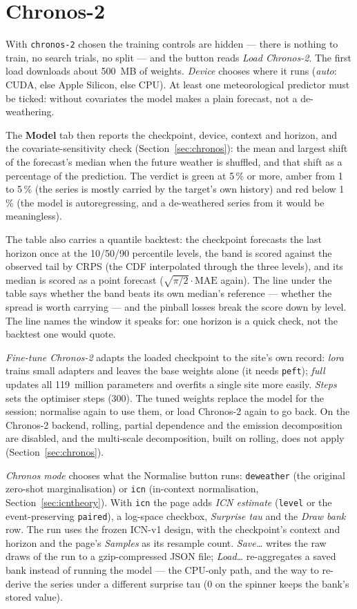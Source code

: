 \documentclass[11pt]{report}
\newcommand{\codeunderscore}{\textunderscore\allowbreak}
\newcommand{\code}[1]{\texttt{\let\_\codeunderscore #1}}
\newcommand{\tab}[1]{\textbf{#1}}
\begin{document}
\section{Chronos-2}\label{sec:chronosui}
With \code{chronos-2} chosen the training controls are hidden --- there is nothing to
train, no search trials, no split --- and the button reads \emph{Load Chronos-2}. The first load
downloads about 500~MB of weights. \emph{Device} chooses where it runs (\emph{auto}:
CUDA, else Apple Silicon, else CPU). At least one meteorological predictor must be
ticked: without covariates the model makes a plain forecast, not a de-weathering.

The \tab{Model} tab then reports the checkpoint, device, context and horizon, and the
covariate-sensitivity check (Section~\ref{sec:chronos}): the mean and largest shift of the
forecast's median when the future weather is shuffled, and that shift as a percentage of
the prediction. The verdict is green at 5\,\% or more, amber from 1 to 5\,\% (the series is
mostly carried by the target's own history) and red below 1\,\% (the model is
autoregressing, and a de-weathered series from it would be meaningless).

The table also carries a quantile backtest: the checkpoint forecasts the last horizon once
at the 10/50/90 percentile levels, the band is scored against the observed tail by CRPS
(the CDF interpolated through the three levels), and its median is scored as a point
forecast ($\sqrt{\pi/2}\cdot\mathrm{MAE}$ again). The line under the table says whether the
band beats its own median's reference --- whether the spread is worth carrying --- and the
pinball losses break the score down by level. The line names the window it speaks for: one
horizon is a quick check, not the backtest one would quote.

\emph{Fine-tune Chronos-2} adapts the loaded checkpoint to the site's own record:
\emph{lora} trains small adapters and leaves the base weights alone (it needs
\code{peft}); \emph{full} updates all 119~million parameters and overfits a single site
more easily. \emph{Steps} sets the optimiser steps (300). The tuned weights replace the
model for the session; normalise again to use them, or load Chronos-2 again to go back.
On the Chronos-2 backend, rolling, partial dependence and the emission decomposition
are disabled, and the multi-scale decomposition, built on rolling, does not apply
(Section~\ref{sec:chronos}).

\emph{Chronos mode} chooses what the Normalise button runs: \code{deweather} (the
original zero-shot marginalisation) or \code{icn} (in-context normalisation,
Section~\ref{sec:icntheory}). With \code{icn} the page adds \emph{ICN estimate}
(\code{level} or the event-preserving \code{paired}), a log-space checkbox,
\emph{Surprise tau} and the \emph{Draw bank} row. The run uses the frozen ICN-v1
design, with the checkpoint's context and horizon and the page's \emph{Samples} as its
resample count. \emph{Save\ldots} writes the raw draws of the run to a gzip-compressed JSON
file; \emph{Load\ldots} re-aggregates a saved bank instead of running the model --- the
CPU-only path, and the way to re-derive the series under a different surprise tau (0
on the spinner keeps the bank's stored value).
\end{document}
